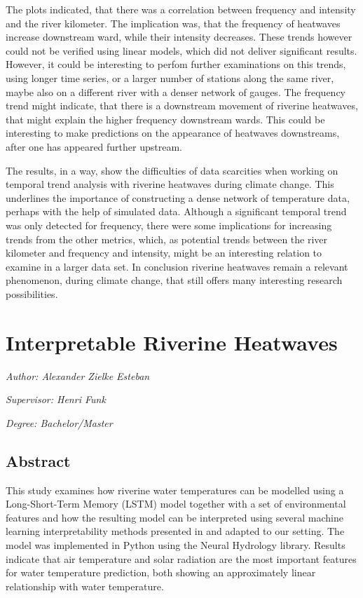 \documentclass[
]{krantz}
\begin{document}
The plots indicated, that there was a correlation between frequency and intensity and the river kilometer. The
implication was, that the frequency of heatwaves increase downstream ward, while their intensity decreases. These trends
however could not be verified using linear models, which did not deliver significant results. However, it could be
interesting to perfom further examinations on this trends, using longer time series, or a larger number of stations along
the same river, maybe also on a different river with a denser network of gauges. The frequency trend might indicate,
that there is a downstream movement of riverine heatwaves, that might explain the higher frequency downstream wards.
This could be interesting to make predictions on the appearance of heatwaves downstreams, after one has appeared further
upstream.

The results, in a way, show the difficulties of data scarcities when working on temporal trend analysis with riverine
heatwaves during climate change. This underlines the importance of constructing a dense network of temperature data,
perhaps with the help of simulated data. Although a significant temporal trend was only detected for frequency, there
were some implications for increasing trends from the other metrics, which, as potential trends between the river
kilometer and frequency and intensity, might be an interesting relation to examine in a larger data set. In conclusion
riverine heatwaves remain a relevant phenomenon, during climate change, that still offers many interesting research
possibilities.

\chapter{Interpretable Riverine Heatwaves}\label{irh}

\emph{Author: Alexander Zielke Esteban}

\emph{Supervisor: Henri Funk}

\emph{Degree: Bachelor/Master}

\section{Abstract}\label{abstract-2}

This study examines how riverine water temperatures can be modelled using a Long-Short-Term Memory (LSTM) model together with a set of environmental features and how the resulting model can be interpreted using several machine learning interpretability methods presented in \citet{molnar2025} and adapted to our setting. The model was implemented in Python using the Neural Hydrology library. Results indicate that air temperature and solar radiation are the most important features for water temperature prediction, both showing an approximately linear relationship with water temperature.
\end{document}
